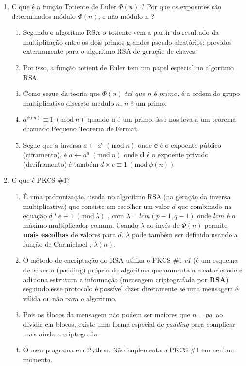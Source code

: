 \documentclass[conference]{IEEEtran}
\begin{document}
\begin{enumerate}
  \item O que é a função Totiente de Euler $\Phi(n)$ ? Por que os expoentes são
  determinados módulo $\Phi(n)$, e não módulo n ?

    \begin{enumerate}
      \item Segundo o algoritmo RSA \cite{rsakey} o totiente vem a partir do
      resultado da multiplicação entre os dois primos grandes pseudo-aleatórios;
      providos externamente para o algoritmo RSA de geração de chaves.
      \item Por isso, a função totient de Euler tem um papel especial no 
      algoritmo RSA.
      \item Como segue da teoria que $\Phi(n) \textit{ tal que } n \textit{ é
      primo}$. é a ordem do grupo multiplicativo discreto modulo $n$, $n$ é um
      primo.
      \item $a^{\phi(n)} \equiv 1\ (\textrm{mod}\ n)$ quando n é um primo, isso
      nos leva a um teorema chamado Pequeno Teorema de Fermat.
      \item Segue que a inversa $a \leftarrow a^e\ (\textrm{mod}\ n)$ onde 
      \textbf{e} é o expoente público (ciframento), é $a \leftarrow a^d\ 
      (\textrm{mod}\ n)$ onde \textbf{d} é o expoente privado (deciframento)
      é também $d \times e \equiv 1\ (\textrm{mod}\ \phi(n))$
    \end{enumerate}

  \item O que é PKCS \#1?

    \begin{enumerate}
      \item É uma padronização, usada no algoritmo RSA (na geração da inversa
      multiplicativa) que consiste em escolher um valor $d$ que combinado na
      equação $d*e \equiv 1\ (\textrm{mod}\ \lambda)$ \cite{pkcs1}, com $\lambda
      = lcm(p - 1, q - 1)$ onde $lcm$ é o máximo multiplicador comum. Usando
      $\lambda$ ao invés de $\Phi(n)$ permite \textbf{mais escolhas} de valores
      para $d$. $\lambda$ pode também ser definido usando a função de Carmichael
      \cite{carm}, $\lambda(n)$.
      \item O método de encriptação do RSA utiliza o PKCS \#1 \textit{v1} (é um
      esquema de enxerto (padding) próprio do algoritmo que aumenta a
      aleatoriedade e adiciona estrutura a informação (mensagem criptografada
      por \textbf{RSA}) seguindo esse protocolo é possível dizer diretamente se
      uma mensagem é válida ou não para o algoritmo.
      \item Pois os blocos da mensagem não podem ser maiores que $n = pq$, ao
      dividir em blocos, existe uma forma especial de \textit{padding} para
      complicar mais ainda a criptografia.
      \item O meu programa em Python. Não implementa o PKCS \#1 em nenhum
      momento.
    \end{enumerate}


\end{enumerate}
\end{document}
